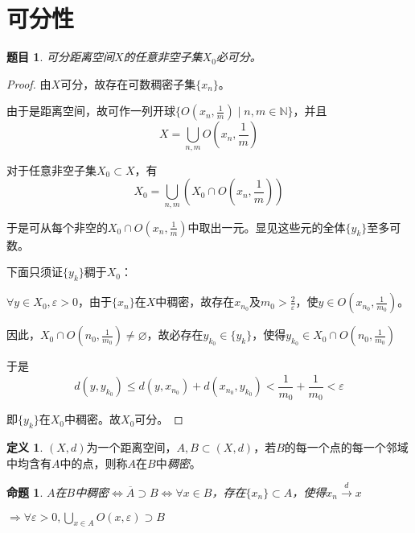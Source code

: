 \documentclass[winfonts,UTF8,c5size,a4paper,fancyhdr,hyperref,titlepage,nocap]{ctexart}
\theoremstyle{question}
\newtheorem{Qut}{题目}
\theoremstyle{theorem}
\newtheorem{prop}[thm]{命题}
\theoremstyle{definition}
\newtheorem{defn}[thm]{定义}
\theoremstyle{remark}
\numberwithin{equation}{subsection}
\newcommand{\N}{\mathbb{N}}
\newcommand{\red}{\color{red}}
\begin{document}
\section{可分性}
\begin{Qut}
  可分距离空间$X$的任意非空子集$X_0$必可分。
\end{Qut}
\begin{proof}
  由$X$可分，故存在可数稠密子集$\{x_n\}$。

  由于是距离空间，故可作一列开球$\{O(x_n,\frac{1}{m})\mid n,m\in\N\}$，并且
  \begin{equation*}
  X=\bigcup_{n,m}O(x_n,\frac{1}{m})
  \end{equation*}

  对于任意非空子集$X_0\subset X$，有
  \begin{equation*}
  X_0=\bigcup_{n,m}(X_0\cap O(x_n,\frac{1}{m}))
  \end{equation*}

  于是可从每个非空的$X_0\cap O(x_n,\frac{1}{m})$中取出一元。显见这些元的全体$\{y_k\}$至多可数。

  下面只须证$\{y_k\}$稠于$X_0$：

  $\forall y\in X_0,\varepsilon>0$，由于$\{x_n\}$在$X$中稠密，故存在$x_{n_0}$及$m_0>\frac{2}{\varepsilon}$，使$y\in O(x_{n_0},\frac{1}{m_0})$。

  因此，$X_0\cap O({n_0},\frac{1}{m_0})\neq\varnothing$，故必存在$y_{k_0}\in\{y_k\}$，使得$y_{k_0}\in X_0\cap O({n_0},\frac{1}{m_0})$

  于是
  \begin{equation*}
  d(y,y_{k_0})\leqslant d(y,x_{n_0})+d(x_{n_0},y_{k_0})<\frac{1}{m_0}+\frac{1}{m_0}<\varepsilon
  \end{equation*}

  即$\{y_k\}$在$X_0$中稠密。故$X_0$可分。
\end{proof}

\begin{defn}
  $(X,d)$为一个距离空间，$A,B\subset(X,d)$，若$B$的每一个点的每一个邻域中均含有$A$中的点，则称$A$在$B$中\emph{\red 稠密}。
\end{defn}

\begin{prop}
  $A$在$B$中稠密$\Longleftrightarrow \overline{A}\supset B\Longleftrightarrow\forall x\in B$，存在$\{x_n\}\subset A$，使得$x_n\stackrel{d}{\to}x$

  $\Longrightarrow\forall\varepsilon>0,\bigcup_{x\in A}O(x,\varepsilon)\supset B$
\end{prop}
\end{document}
